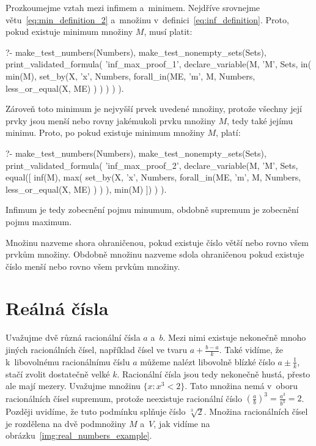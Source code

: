 Prozkoumejme vztah mezi infimem a~minimem. Nejdříve srovnejme větu~\eqref{eq:min_definition_2} a~množinu v~definici~\eqref{eq:inf_definition}. Proto, pokud existuje minimum množiny \(M\), musí platit:

\begin{prolog}
?-	make_test_numbers(Numbers),
	make_test_nonempty_sets(Sets),
	print_validated_formula(
		'inf_max_proof_1',
		declare_variable(M, 'M', Sets,
			in(
				min(M),
				set_by(X, 'x', Numbers, 
					forall_in(ME, 'm', M, Numbers,
						less_or_equal(X, ME)
					)				
				)
			)
		)
	).
\end{prolog}

Zároveň toto minimum je nejvyšší prvek uvedené množiny, protože všechny její prvky jsou menší nebo rovny jakémukoli prvku množiny \(M\), tedy také jejímu minimu. Proto, po pokud existuje minimum množiny \(M\), platí:

\begin{prolog}
?-	make_test_numbers(Numbers),
	make_test_nonempty_sets(Sets),
	print_validated_formula(
		'inf_max_proof_2',
		declare_variable(M, 'M', Sets,
			equal([
				inf(M),
				max(
					set_by(X, 'x', Numbers, 
						forall_in(ME, 'm', M, Numbers,
							less_or_equal(X, ME)
						)
					)
				),
				min(M)
			])
		)
	).
\end{prolog}

Infimum je tedy zobecnění pojmu minumum, obdobně supremum je zobecnění pojmu maximum.

Množinu nazveme shora ohraničenou, pokud existuje číslo větší nebo rovno všem prvkům množiny. Obdobně množinu nazveme sdola ohraničenou pokud existuje číslo menší nebo rovno všem prvkům množiny.

\section{Reálná čísla}

Uvažujme dvě různá racionální čísla \(a\) a~\(b\). Mezi nimi existuje nekonečně mnoho jiných racionálních čísel, například čísel ve tvaru \(a + \frac{b - a}{k}\). Také vidíme, že k~libovolnému racionálnímu číslu \(a\) můžeme nalézt libovolně blízké číslo \(a \pm \frac{1}{k}\), stačí zvolit dostatečně velké \(k\). Racionální čísla jsou tedy nekonečně hustá, přesto ale mají mezery. Uvažujme množinu \(\{x: x^3 < 2\}\). Tato množina nemá v~oboru racionálních čísel supremum, protože neexistuje racionální číslo \(\left( \frac{a}{b} \right)^3 = \frac{a^3}{b^3} = 2\). Později uvidíme, že tuto podmínku splňuje číslo \(\sqrt[3]{2}\). Množina racionálních čísel je rozdělena na dvě podmnožiny \(M\) a~\(V\), jak vidíme na obrázku~\ref{img:real_numbers_example}.

